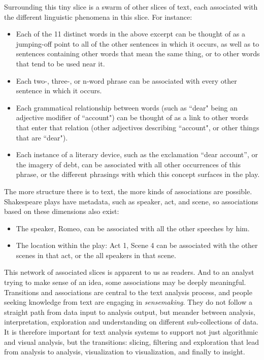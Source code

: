 \documentclass{sig-alternate}
\begin{document}
Surrounding this tiny slice is a swarm of other slices of text, each associated with the different linguistic phenomena in this slice. For instance:
\begin{itemize}
\item Each of the 11 distinct words in the above excerpt can be thought of as a jumping-off point to all of the other sentences in which it occurs, as well as to sentences containing other words that mean the same thing, or to other words that tend to be used near it.
\item Each  two-, three-, or n-word phrase can be associated with every other sentence in which it occurs.
\item  Each grammatical relationship between words (such as ``dear" being an adjective modifier of  ``account") can be thought of as a link to other words that enter that relation (other adjectives describing ``account", or other things that are ``dear").
\item Each instance of a literary device, such as the exclamation ``dear account'', or the imagery of debt, can be associated with all other occurrences of this phrase, or the different phrasings with which this concept surfaces in the play.
\end{itemize}

The more structure there is to text, the more kinds of associations are possible. Shakespeare plays have metadata, such as speaker, act, and scene, so associations based on these dimensions also exist:
\begin{itemize}
\item The speaker, Romeo, can be associated with all the other speeches by him.
\item The location within the play: Act 1, Scene 4 can be associated with the other scenes in that act, or the all speakers in that scene.
\end{itemize}

This network of associated slices is apparent to us as readers. And to an analyst trying to make sense of an idea, some associations may be deeply meaningful.  Transitions  and associations are central to the text analysis process, and people seeking knowledge from text are engaging in \emph{sensemaking}. They do not follow a straight path from data input to analysis output, but meander between analysis, interpretation, exploration and understanding on different sub-collections of data.  It is therefore important for text analysis systems to support not just algorithmic and visual analysis, but the transitions: slicing, filtering and exploration that lead from analysis to analysis, visualization to visualization, and finally to insight.
\end{document}
